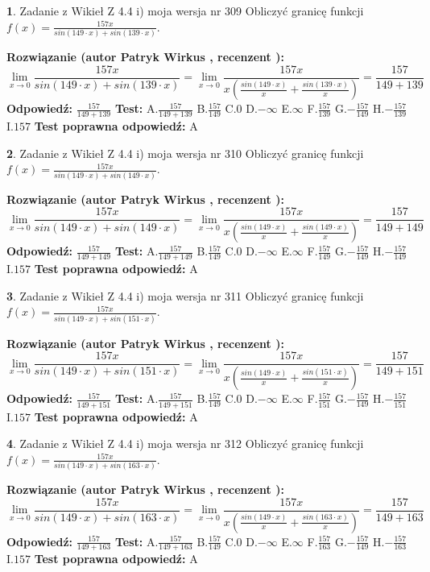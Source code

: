 \documentclass[12pt, a4paper]{article}
\theoremstyle{definition} %
\newtheorem{zad}{}
\newcommand{\zadStart}[1]{\begin{zad}#1\newline}
\newcommand{\zadStop}{\end{zad}}
\newcommand{\rozwStart}[2]{\noindent \textbf{Rozwiązanie (autor #1 , recenzent #2): }\newline}
\newcommand{\rozwStop}{\newline}
\newcommand{\odpStart}{\noindent \textbf{Odpowiedź:}\newline}
\newcommand{\odpStop}{\newline}
\newcommand{\testStart}{\noindent \textbf{Test:}\newline}
\newcommand{\testStop}{\newline}
\newcommand{\kluczStart}{\noindent \textbf{Test poprawna odpowiedź:}\newline}
\newcommand{\kluczStop}{\newline}
\begin{document}
\zadStart{Zadanie z Wikieł Z 4.4 i) moja wersja nr 309}
Obliczyć granicę funkcji $f(x)=\frac{157x}{sin(149\cdot x) +sin(139\cdot x)}$.
\zadStop
\rozwStart{Patryk Wirkus}{}
$$\lim\limits_{x\to 0}\frac{157x}{sin(149\cdot x) +sin(139\cdot x)}=\lim\limits_{x\to 0}\frac{157x}{x(\frac{sin(149\cdot x)}{x}+\frac{sin(139\cdot x)}{x})}=\frac{157}{149+139}$$
\rozwStop
\odpStart
$\frac{157}{149+139}$
\odpStop
\testStart
A.$\frac{157}{149+139}$
B.$\frac{157}{149}$
C.$0$
D.$-\infty$
E.$\infty$
F.$\frac{157}{139}$
G.$-\frac{157}{149}$
H.$-\frac{157}{139}$
I.$157$
\testStop
\kluczStart
A
\kluczStop



\zadStart{Zadanie z Wikieł Z 4.4 i) moja wersja nr 310}
Obliczyć granicę funkcji $f(x)=\frac{157x}{sin(149\cdot x) +sin(149\cdot x)}$.
\zadStop
\rozwStart{Patryk Wirkus}{}
$$\lim\limits_{x\to 0}\frac{157x}{sin(149\cdot x) +sin(149\cdot x)}=\lim\limits_{x\to 0}\frac{157x}{x(\frac{sin(149\cdot x)}{x}+\frac{sin(149\cdot x)}{x})}=\frac{157}{149+149}$$
\rozwStop
\odpStart
$\frac{157}{149+149}$
\odpStop
\testStart
A.$\frac{157}{149+149}$
B.$\frac{157}{149}$
C.$0$
D.$-\infty$
E.$\infty$
F.$\frac{157}{149}$
G.$-\frac{157}{149}$
H.$-\frac{157}{149}$
I.$157$
\testStop
\kluczStart
A
\kluczStop



\zadStart{Zadanie z Wikieł Z 4.4 i) moja wersja nr 311}
Obliczyć granicę funkcji $f(x)=\frac{157x}{sin(149\cdot x) +sin(151\cdot x)}$.
\zadStop
\rozwStart{Patryk Wirkus}{}
$$\lim\limits_{x\to 0}\frac{157x}{sin(149\cdot x) +sin(151\cdot x)}=\lim\limits_{x\to 0}\frac{157x}{x(\frac{sin(149\cdot x)}{x}+\frac{sin(151\cdot x)}{x})}=\frac{157}{149+151}$$
\rozwStop
\odpStart
$\frac{157}{149+151}$
\odpStop
\testStart
A.$\frac{157}{149+151}$
B.$\frac{157}{149}$
C.$0$
D.$-\infty$
E.$\infty$
F.$\frac{157}{151}$
G.$-\frac{157}{149}$
H.$-\frac{157}{151}$
I.$157$
\testStop
\kluczStart
A
\kluczStop



\zadStart{Zadanie z Wikieł Z 4.4 i) moja wersja nr 312}
Obliczyć granicę funkcji $f(x)=\frac{157x}{sin(149\cdot x) +sin(163\cdot x)}$.
\zadStop
\rozwStart{Patryk Wirkus}{}
$$\lim\limits_{x\to 0}\frac{157x}{sin(149\cdot x) +sin(163\cdot x)}=\lim\limits_{x\to 0}\frac{157x}{x(\frac{sin(149\cdot x)}{x}+\frac{sin(163\cdot x)}{x})}=\frac{157}{149+163}$$
\rozwStop
\odpStart
$\frac{157}{149+163}$
\odpStop
\testStart
A.$\frac{157}{149+163}$
B.$\frac{157}{149}$
C.$0$
D.$-\infty$
E.$\infty$
F.$\frac{157}{163}$
G.$-\frac{157}{149}$
H.$-\frac{157}{163}$
I.$157$
\testStop
\kluczStart
A
\kluczStop
\end{document}
